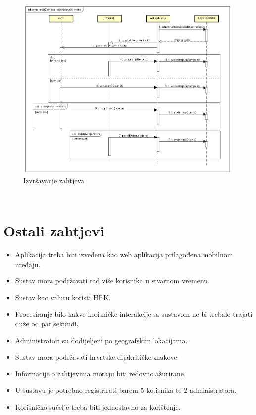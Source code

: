 				\newpage
				\begin{figure}[H]
					\includegraphics[scale=0.65]{slike/izvrsavanje-zahtjeva.png} %
					\centering
					\caption{Izvršavanje zahtjeva}
				\end{figure}
				
				\
				\eject
	
		\section{Ostali zahtjevi}
		
		\begin{itemize}
			\item Aplikacija treba biti izvedena kao web aplikacija prilagođena mobilnom uređaju.
			\item Sustav mora podržavati rad više korisnika u stvarnom vremenu.
			\item Sustav kao valutu koristi HRK.
			\item Procesiranje bilo kakve korisničke interakcije sa sustavom ne bi trebalo trajati duže od par sekundi.
			\item Administratori su dodijeljeni po geografskim lokacijama.
			\item Sustav mora podržavati hrvatske dijakritičke znakove.
			\item Informacije o zahtjevima moraju biti redovno ažurirane.
			\item U sustavu je potrebno registrirati barem 5 korisnika te 2 administratora.
			\item Korisničko sučelje treba biti jednostavno za korištenje.
		\end{itemize}
			 
			 
			 
	